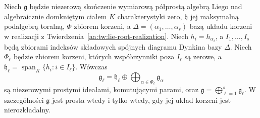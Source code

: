 \begin{twierdzenie}
\label{aa:tw:lie-dynkin-components}
Niech $\mathfrak g$ będzie niezerową skończenie wymiarową półprostą algebrą Liego nad algebraicznie domkniętym ciałem $K$ charakterystyki zero, $\mathfrak h$ jej maksymalną podalgebrą toralną, $\Phi$ zbiorem korzeni, a $\Delta=(\alpha_1,\ldots,\alpha_r)$ bazą układu korzeni w realizacji z Twierdzenia~\ref{aa:tw:lie-root-realization}. Niech $h_i=h_{\alpha_i}$, a $I_1,\ldots,I_s$ będą zbiorami indeksów składowych spójnych diagramu Dynkina bazy $\Delta$. Niech $\Phi_\ell$ będzie zbiorem korzeni, których współczynniki poza $I_\ell$ są zerowe, a $\mathfrak h_\ell=\operatorname{span}_K\{h_i:i\in I_\ell\}$. Wówczas
\[
 \mathfrak g_\ell=\mathfrak h_\ell\oplus
 \bigoplus_{\alpha\in\Phi_\ell}\mathfrak g_\alpha
\]
są niezerowymi prostymi ideałami, komutującymi parami, oraz $\mathfrak g=\bigoplus_{\ell=1}^s\mathfrak g_\ell$. W szczególności $\mathfrak g$ jest prosta wtedy i tylko wtedy, gdy jej układ korzeni jest nierozkładalny.
\end{twierdzenie}
